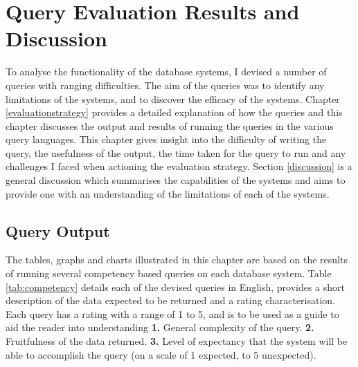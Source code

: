 \chapter{Query Evaluation Results and Discussion}\label{results}
To analyse the functionality of the database systems, I devised a number of queries with ranging difficulties. The aim of the queries was to identify any limitations of the systems, and to discover the efficacy of the systems. Chapter \ref{evaluationstrategy} provides a detailed explanation of how the queries and this chapter discusses the output and results of running the queries in the various query languages. This chapter gives insight into the difficulty of writing the query, the usefulness of the output, the time taken for the query to run and any challenges I faced when actioning the evaluation strategy. Section \ref{discussion} is a general discussion which summarises the capabilities of the systems and aims to provide one with an understanding of the limitations of each of the systems.

\section{Query Output}\label{output}
The tables, graphs and charts illustrated in this chapter are based on the results of running several competency based queries on each database system. Table \ref{tab:competency} details each of the devised queries in English, provides a short description of the data expected to be returned and a rating characterisation. Each query has a rating with a range of 1 to 5, and is to be used as a guide to aid the reader into understanding \textbf{1.} General complexity of the query. \textbf{2.} Fruitfulness of the data returned. \textbf{3.} Level of expectancy that the system will be able to accomplish the query (on a scale of 1 expected, to 5 unexpected).

